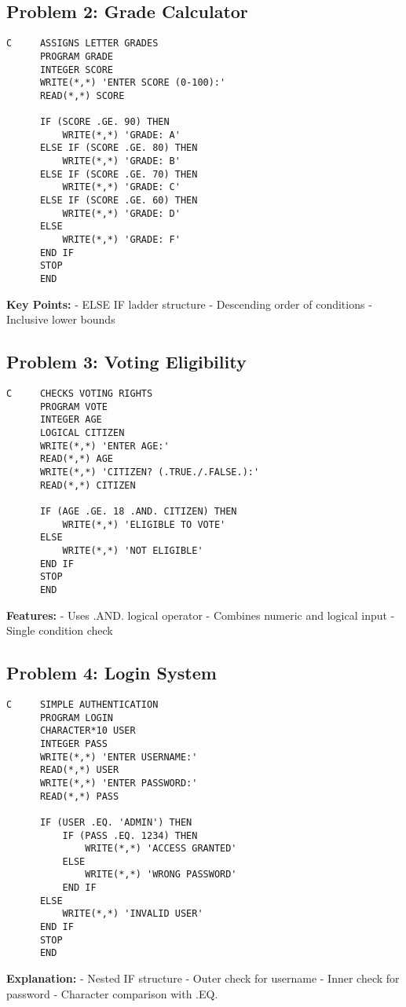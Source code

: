 \documentclass{book}
\begin{document}
\subsection*{Problem 2: Grade Calculator}
\begin{verbatim}
C     ASSIGNS LETTER GRADES
      PROGRAM GRADE
      INTEGER SCORE
      WRITE(*,*) 'ENTER SCORE (0-100):'
      READ(*,*) SCORE
      
      IF (SCORE .GE. 90) THEN
          WRITE(*,*) 'GRADE: A'
      ELSE IF (SCORE .GE. 80) THEN
          WRITE(*,*) 'GRADE: B'
      ELSE IF (SCORE .GE. 70) THEN
          WRITE(*,*) 'GRADE: C'
      ELSE IF (SCORE .GE. 60) THEN
          WRITE(*,*) 'GRADE: D'
      ELSE
          WRITE(*,*) 'GRADE: F'
      END IF
      STOP
      END
\end{verbatim}
\textbf{Key Points:}
- ELSE IF ladder structure
- Descending order of conditions
- Inclusive lower bounds

\subsection*{Problem 3: Voting Eligibility}
\begin{verbatim}
C     CHECKS VOTING RIGHTS
      PROGRAM VOTE
      INTEGER AGE
      LOGICAL CITIZEN
      WRITE(*,*) 'ENTER AGE:'
      READ(*,*) AGE
      WRITE(*,*) 'CITIZEN? (.TRUE./.FALSE.):'
      READ(*,*) CITIZEN
      
      IF (AGE .GE. 18 .AND. CITIZEN) THEN
          WRITE(*,*) 'ELIGIBLE TO VOTE'
      ELSE
          WRITE(*,*) 'NOT ELIGIBLE'
      END IF
      STOP
      END
\end{verbatim}
\textbf{Features:}
- Uses .AND. logical operator
- Combines numeric and logical input
- Single condition check

\subsection*{Problem 4: Login System}
\begin{verbatim}
C     SIMPLE AUTHENTICATION
      PROGRAM LOGIN
      CHARACTER*10 USER
      INTEGER PASS
      WRITE(*,*) 'ENTER USERNAME:'
      READ(*,*) USER
      WRITE(*,*) 'ENTER PASSWORD:'
      READ(*,*) PASS
      
      IF (USER .EQ. 'ADMIN') THEN
          IF (PASS .EQ. 1234) THEN
              WRITE(*,*) 'ACCESS GRANTED'
          ELSE
              WRITE(*,*) 'WRONG PASSWORD'
          END IF
      ELSE
          WRITE(*,*) 'INVALID USER'
      END IF
      STOP
      END
\end{verbatim}
\textbf{Explanation:}
- Nested IF structure
- Outer check for username
- Inner check for password
- Character comparison with .EQ.
\end{document}
